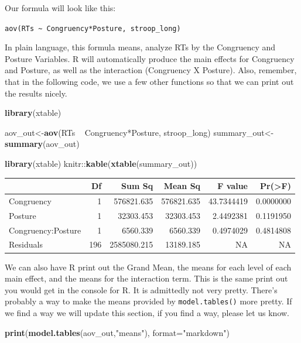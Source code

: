 \documentclass[]{book}
\newenvironment{Shaded}{\begin{snugshade}}{\end{snugshade}}
\newcommand{\KeywordTok}[1]{\textcolor[rgb]{0.13,0.29,0.53}{\textbf{{#1}}}}
\newcommand{\DataTypeTok}[1]{\textcolor[rgb]{0.13,0.29,0.53}{{#1}}}
\newcommand{\StringTok}[1]{\textcolor[rgb]{0.31,0.60,0.02}{{#1}}}
\newcommand{\NormalTok}[1]{{#1}}
\theoremstyle{definition}
\theoremstyle{definition}
\theoremstyle{definition}
\theoremstyle{remark}
\begin{document}
Our formula will look like this:

\texttt{aov(RTs\ \textasciitilde{}\ Congruency*Posture,\ stroop\_long)}

In plain language, this formula means, analyze RTs by the Congruency and
Posture Variables. R will automatically produce the main effects for
Congruency and Posture, as well as the interaction (Congruency X
Posture). Also, remember, that in the following code, we use a few other
functions so that we can print out the results nicely.

\begin{Shaded}
\begin{Highlighting}[]
\KeywordTok{library}\NormalTok{(xtable)}

\NormalTok{aov_out<-}\KeywordTok{aov}\NormalTok{(RTs ~}\StringTok{ }\NormalTok{Congruency*Posture, stroop_long)}
\NormalTok{summary_out<-}\KeywordTok{summary}\NormalTok{(aov_out)}

\KeywordTok{library}\NormalTok{(xtable)}
\NormalTok{knitr::}\KeywordTok{kable}\NormalTok{(}\KeywordTok{xtable}\NormalTok{(summary_out))}
\end{Highlighting}
\end{Shaded}

\begin{tabular}{l|r|r|r|r|r}
\hline
  & Df & Sum Sq & Mean Sq & F value & Pr(>F)\\
\hline
Congruency & 1 & 576821.635 & 576821.635 & 43.7344419 & 0.0000000\\
\hline
Posture & 1 & 32303.453 & 32303.453 & 2.4492381 & 0.1191950\\
\hline
Congruency:Posture & 1 & 6560.339 & 6560.339 & 0.4974029 & 0.4814808\\
\hline
Residuals & 196 & 2585080.215 & 13189.185 & NA & NA\\
\hline
\end{tabular}

We can also have R print out the Grand Mean, the means for each level of
each main effect, and the means for the interaction term. This is the
same print out you would get in the console for R. It is admittedly not
very pretty. There's probably a way to make the means provided by
\texttt{model.tables()} more pretty. If we find a way we will update
this section, if you find a way, please let us know.

\begin{Shaded}
\begin{Highlighting}[]
\KeywordTok{print}\NormalTok{(}\KeywordTok{model.tables}\NormalTok{(aov_out,}\StringTok{"means"}\NormalTok{), }\DataTypeTok{format=}\StringTok{"markdown"}\NormalTok{)}
\end{Highlighting}
\end{Shaded}
\end{document}
